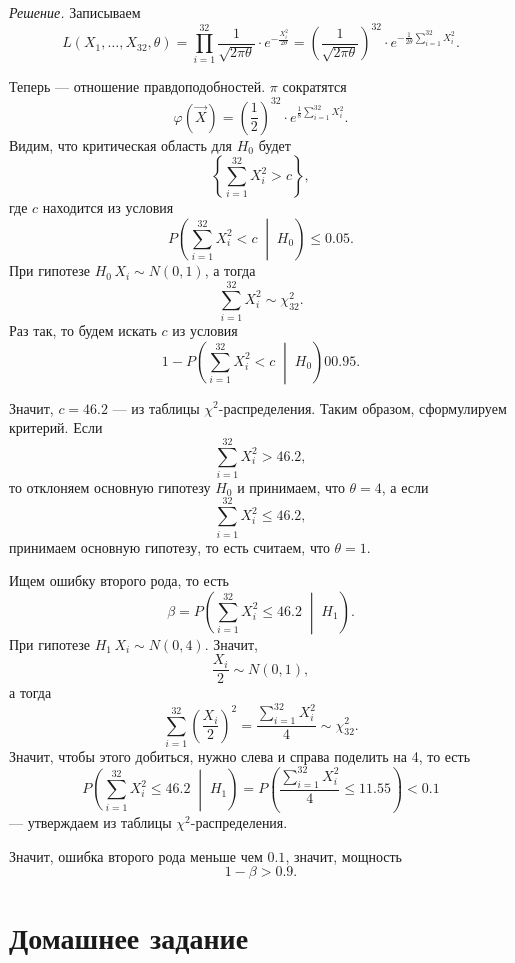 \textit{Решение.} Записываем
$$L \left( X_1, \dotsc, X_{32}, \theta \right) =
  \prod \limits_{i = 1}^{32} \frac{1}{ \sqrt{2 \pi \theta }} \cdot e^{- \frac{X_i^2}{2 \theta }} =
  \left( \frac{1}{ \sqrt{2 \pi \theta }} \right)^{32} \cdot
  e^{- \frac{1}{2 \theta} \sum \limits_{i = 1}^{32} X_i^2}.$$

Теперь --- отношение правдоподобностей.
$ \pi $ сократятся
$$ \varphi \left( \vec{X} \right) =
   \left( \frac{1}{2} \right)^{32} \cdot e^{\frac{1}{8} \sum \limits_{i = 1}^{32} X_i^2}.$$
Видим, что критическая область для $H_0$ будет
$$ \left\{ \sum \limits_{i = 1}^{32} X_i^2 > c \right\},$$
где $c$ находится из условия
$$P \left( \sum \limits_{i = 1}^{32} X_i^2 < c \; \middle| \; H_0 \right) \leq
  0.05.$$
При гипотезе $H_0 \, X_i \sim N \left( 0, 1 \right) $, а тогда
$$ \sum \limits_{i = 1}^{32} X_i^2 \sim
  \chi_{32}^2.$$
Раз так, то будем искать $c$ из условия
$$1 - P \left( \sum \limits_{i = 1}^{32} X_i^2 < c \; \middle| \; H_0 \right) 0
  0.95.$$

Значит, $c = 46.2$ --- из таблицы $ \chi^2$-распределения.
Таким образом, сформулируем критерий.
Если
$$ \sum \limits_{i = 1}^{32} X_i^2 >
  46.2,$$
то отклоняем основную гипотезу $H_0$ и принимаем, что $ \theta = 4$, а если
$$ \sum \limits_{i = 1}^{32} X_i^2 \leq
  46.2,$$
принимаем основную гипотезу, то есть считаем, что $ \theta = 1$.

Ищем ошибку второго рода, то есть
$$ \beta =
  P \left( \sum \limits_{i = 1}^{32} X_i^2 \leq 46.2 \; \middle| \; H_1 \right).$$
При гипотезе $H_1 \, X_i \sim N \left( 0, 4 \right) $.
Значит,
$$ \frac{X_i}{2} \sim
  N \left( 0, 1 \right),$$
а тогда
$$ \sum \limits_{i = 1}^{32} \left( \frac{X_i}{2} \right)^2 =
  \frac{ \sum \limits_{i = 1}^{32} X_i^2}{4} \sim
  \chi_{32}^2.$$
Значит, чтобы этого добиться, нужно слева и справа поделить на 4, то есть
$$P \left( \sum \limits_{i = 1}^{32} X_i^2 \leq 46.2 \; \middle| \; H_1 \right) =
  P \left( \frac{ \sum \limits_{i = 1}^{32} X_i^2}{4} \leq 11.55 \right) <
  0.1$$
--- утверждаем из таблицы $ \chi^2$-распределения.

Значит, ошибка второго рода меньше чем $0.1$, значит, мощность
$$1 - \beta >
  0.9.$$

\section*{Домашнее задание}
